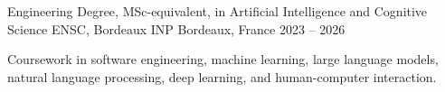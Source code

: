 
\begin{cventries}
  \cventry
    {Engineering Degree, MSc-equivalent, in Artificial Intelligence and Cognitive Science}
    {ENSC, Bordeaux INP}
    {Bordeaux, France}
    {2023 -- 2026}
    {
      \begin{cvitems}
        \item {Coursework in software engineering, machine learning, large language models, natural language processing, deep learning, and human-computer interaction.}
      \end{cvitems}
    }
\end{cventries}
